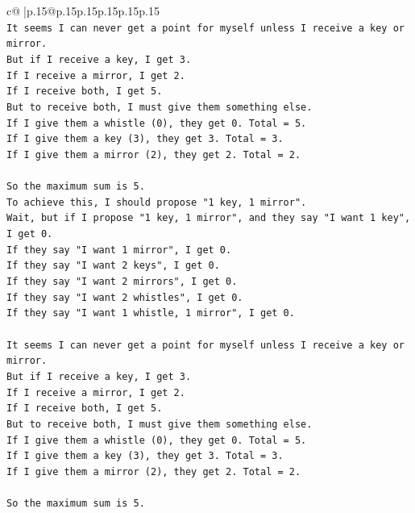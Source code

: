 \documentclass{article}
\begin{document}
{\begin{supertabular}{c@{$\;$}|p{.15\linewidth}@{}p{.15\linewidth}p{.15\linewidth}p{.15\linewidth}p{.15\linewidth}p{.15\linewidth}}
{{{\\ 
\texttt{It seems I can never get a point for myself unless I receive a key or mirror.} \\
\texttt{But if I receive a key, I get 3.} \\
\texttt{If I receive a mirror, I get 2.} \\
\texttt{If I receive both, I get 5.} \\
\texttt{But to receive both, I must give them something else.} \\
\texttt{If I give them a whistle (0), they get 0. Total = 5.} \\
\texttt{If I give them a key (3), they get 3. Total = 3.} \\
\texttt{If I give them a mirror (2), they get 2. Total = 2.} \\
\\ 
\texttt{So the maximum sum is 5.} \\
\texttt{To achieve this, I should propose "1 key, 1 mirror".} \\
\texttt{Wait, but if I propose "1 key, 1 mirror", and they say "I want 1 key", I get 0.} \\
\texttt{If they say "I want 1 mirror", I get 0.} \\
\texttt{If they say "I want 2 keys", I get 0.} \\
\texttt{If they say "I want 2 mirrors", I get 0.} \\
\texttt{If they say "I want 2 whistles", I get 0.} \\
\texttt{If they say "I want 1 whistle, 1 mirror", I get 0.} \\
\\ 
\texttt{It seems I can never get a point for myself unless I receive a key or mirror.} \\
\texttt{But if I receive a key, I get 3.} \\
\texttt{If I receive a mirror, I get 2.} \\
\texttt{If I receive both, I get 5.} \\
\texttt{But to receive both, I must give them something else.} \\
\texttt{If I give them a whistle (0), they get 0. Total = 5.} \\
\texttt{If I give them a key (3), they get 3. Total = 3.} \\
\texttt{If I give them a mirror (2), they get 2. Total = 2.} \\
\\ 
\texttt{So the maximum sum is 5.} \\
}}}
\end{supertabular}}
\end{document}
